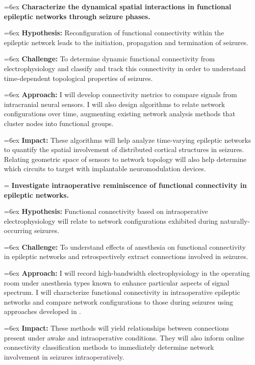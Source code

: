 


\hangindent=6ex
\noindent
{} \textbf{Characterize the dynamical spatial interactions in functional epileptic networks through seizure phases.}

\hangindent=6ex
\textbf{Hypothesis:} Reconfiguration of functional connectivity within the epileptic network leads to the initiation, propagation and termination of seizures.

\hangindent=6ex
\textbf{Challenge:} To determine dynamic functional connectivity from electrophysiology and classify and track this connectivity in order to understand time-dependent topological properties of seizures.

\hangindent=6ex
\textbf{Approach:} I will develop connectivity metrics to compare signals from intracranial neural sensors. I will also design algorithms to relate network configurations over time, augmenting existing network analysis methods that cluster nodes into functional groups.

\hangindent=6ex
\textbf{Impact:} These algorithms will help analyze time-varying epileptic networks to quantify the spatial involvement of distributed cortical structures in seizures. Relating geometric space of sensors to network topology will also help determine which circuits to target with implantable neuromodulation devices.


\hangindent=\parindent
{}
\noindent
{} \textbf{Investigate intraoperative reminiscence of functional connectivity in epileptic networks.}

\hangindent=6ex
\textbf{Hypothesis:} Functional connectivity based on intraoperative electrophysiology will relate to network configurations exhibited during naturally-occurring seizures.

\hangindent=6ex
\textbf{Challenge:} To understand effects of anesthesia on functional connectivity in epileptic networks and retrospectively extract connections involved in seizures.

\hangindent=6ex
\textbf{Approach:} I will record high-bandwidth electrophysiology in the operating room under anesthesia types known to enhance particular aspects of signal spectrum. I will characterize functional connectivity in intraoperative epileptic networks and compare network configurations to those during seizures using approaches developed in .

\hangindent=6ex
\textbf{Impact:} These methods will yield relationships between connections present under awake and intraoperative conditions. They will also inform online connectivity classification methods to immediately determine network involvement in seizures intraoperatively.



